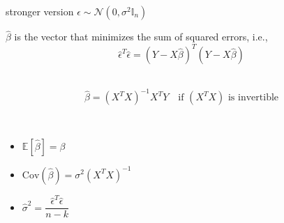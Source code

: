 \documentclass[a4paper,10pt,landscape]{article}
\newcommand{\cov}{\textrm{Cov}}
\begin{document}
\begin{multicols*}{3}
\begin{description}
\begin{enumerate}
		stronger version $\epsilon\sim\mathcal{N}\left(0,\sigma^2\mathbb{I}_n\right)$
	\end{enumerate}
	\item $\hat{\beta}$ is the vector that minimizes the sum of squared errors, i.e., $$\hat{\epsilon}^T\hat{\epsilon}=\left(Y-X\hat{\beta}\right)^T\left(Y-X\hat{\beta}\right)$$
	\item[Solution:] ~
	$$\hat{\beta}=\left(X^TX\right)^{-1}X^TY\quad\text{if }\left(X^TX\right)\text{ is invertible}$$
	\item[Properties:] ~
	\begin{itemize}[itemsep=0pt,topsep=0pt]
		\item $\mathbb{E}\left[\hat{\beta}\right]=\beta$
		\item $\cov\left(\hat{\beta}\right)=\sigma^2\left(X^TX\right)^{-1}$
		\item $\hat{\sigma}^2=\dfrac{\hat{\epsilon}^T\hat{\epsilon}}{n-k}$
	\end{itemize}
\end{description}

\end{multicols*}
\end{document}
